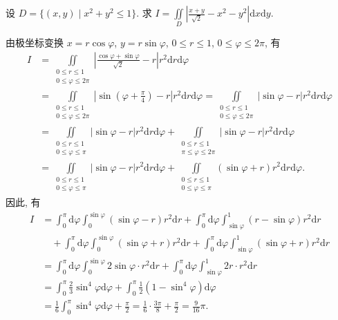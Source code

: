 \documentclass[../../main.tex]{subfiles}%
\begin{document}
\begin{example}
设 \( D = \{ (x,y) \mid x^2 + y^2 \leqslant 1 \} \). 求 \( I = \iint\limits_D \left| \frac{x + y}{\sqrt{2}} - x^2 - y^2 \right| \mathrm{d}x\mathrm{d}y \).
\end{example}
\begin{solution}

由极坐标变换 \( x = r\cos\varphi \), \( y = r\sin\varphi \), \( 0 \leqslant r \leqslant 1 \), \( 0 \leqslant \varphi \leqslant 2\pi \), 有
\begin{align*}
I &= \iint\limits_{\substack{0 \leqslant r \leqslant 1 \\ 0 \leqslant \varphi \leqslant 2\pi}} \left| \frac{\cos\varphi + \sin\varphi}{\sqrt{2}} - r \right| r^2 \mathrm{d}r\mathrm{d}\varphi
\\
&= \iint\limits_{\substack{0 \leqslant r \leqslant 1 \\ 0 \leqslant \varphi \leqslant 2\pi}} \left| \sin\left( \varphi + \frac{\pi}{4} \right) - r \right| r^2 \mathrm{d}r\mathrm{d}\varphi = \iint\limits_{\substack{0 \leqslant r \leqslant 1 \\ 0 \leqslant \varphi \leqslant 2\pi}} \left| \sin\varphi - r \right| r^2 \mathrm{d}r\mathrm{d}\varphi
\\
&= \iint\limits_{\substack{0 \leqslant r \leqslant 1 \\ 0 \leqslant \varphi \leqslant \pi}} \left| \sin\varphi - r \right| r^2 \mathrm{d}r\mathrm{d}\varphi + \iint\limits_{\substack{0 \leqslant r \leqslant 1 \\ \pi \leqslant \varphi \leqslant 2\pi}} \left| \sin\varphi - r \right| r^2 \mathrm{d}r\mathrm{d}\varphi
\\
&= \iint\limits_{\substack{0 \leqslant r \leqslant 1 \\ 0 \leqslant \varphi \leqslant \pi}} \left| \sin\varphi - r \right| r^2 \mathrm{d}r\mathrm{d}\varphi + \iint\limits_{\substack{0 \leqslant r \leqslant 1 \\ 0 \leqslant \varphi \leqslant \pi}} (\sin\varphi + r) r^2 \mathrm{d}r\mathrm{d}\varphi.
\end{align*}
因此, 有
\begin{align*}
I &= \int_0^\pi \mathrm{d}\varphi \int_0^{\sin\varphi} (\sin\varphi - r) r^2 \mathrm{d}r + \int_0^\pi \mathrm{d}\varphi \int_{\sin\varphi}^1 (r - \sin\varphi) r^2 \mathrm{d}r
\\
&\quad + \int_0^\pi \mathrm{d}\varphi \int_0^{\sin\varphi} (\sin\varphi + r) r^2 \mathrm{d}r + \int_0^\pi \mathrm{d}\varphi \int_{\sin\varphi}^1 (\sin\varphi + r) r^2 \mathrm{d}r
\\
&= \int_0^\pi \mathrm{d}\varphi \int_0^{\sin\varphi} 2\sin\varphi \cdot r^2 \mathrm{d}r + \int_0^\pi \mathrm{d}\varphi \int_{\sin\varphi}^1 2r \cdot r^2 \mathrm{d}r
\\
&= \int_0^\pi \frac{2}{3} \sin^4\varphi \mathrm{d}\varphi + \int_0^\pi \frac{1}{2}(1 - \sin^4\varphi) \mathrm{d}\varphi
\\
&= \frac{1}{6} \int_0^\pi \sin^4\varphi \mathrm{d}\varphi + \frac{\pi}{2} = \frac{1}{6} \cdot \frac{3\pi}{8} + \frac{\pi}{2} = \frac{9}{16}\pi.
\end{align*}

\end{solution}
\end{document}
